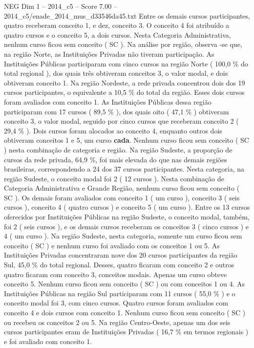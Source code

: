\begin{textsample}{NEG Dim 1 – 2014\_c5 – Score 7.00 – 2014\_c5/enade\_2014\_mus\_d33546da45.txt}
Entre os demais cursos participantes, quatro receberam conceito 1, e dez, conceito 3.
O conceito 4 foi atribuído a quatro cursos e o conceito 5, a dois cursos.
Nesta Categoria Administrativa, nenhum curso ficou sem conceito ( SC ).
Na análise por região, observa -se que, na região Norte, as Instituições Privadas não tiveram participação.
As Instituições Públicas participaram com cinco cursos na região Norte ( 100,0 \% do total regional ), dos quais três obtiveram conceitos 3, o valor modal, e dois obtiveram conceito 1.
Na região Nordeste, a rede privada concentrou dois dos 19 cursos participantes, o equivalente a 10,5 \% do total da região.
Esses dois cursos foram avaliados com conceito 1.
As Instituições Públicas dessa região participaram com 17 cursos ( 89,5 \% ), dos quais oito ( 47,1 \% ) obtiveram conceito 3, o valor modal, seguido por cinco cursos que receberam conceito 2 ( 29,4 \% ).
Dois cursos foram alocados ao conceito 4, enquanto outros dois obtiveram conceitos 1 e 5, um curso \textbf{cada}.
Nenhum curso ficou sem conceito ( SC ) nesta combinação de categoria e região.
Na região Sudeste, a proporção de cursos da rede privada, 64,9 \%, foi mais elevada do que nas demais regiões brasileiras, correspondendo a 24 dos 37 cursos participantes.
Nesta categoria, na região Sudeste, o conceito modal foi 2 ( 12 cursos ).
Nesta combinação de Categoria Administrativa e Grande Região, nenhum curso ficou sem conceito ( SC ).
Os demais foram avaliados com conceito 1 ( um curso ), conceito 3 ( seis cursos ), conceito 4 ( quatro cursos ) e conceito 5 ( um curso ).
Entre os 13 cursos oferecidos por Instituições Públicas na região Sudeste, o conceito modal, também, foi 2 ( seis cursos ), e os demais cursos receberam os conceitos 3 ( cinco cursos ) e 4 ( um curso ).
Na região Sudeste, nesta categoria, somente um curso ficou sem conceito ( SC ) e nenhum curso foi avaliado com os conceitos 1 ou 5.
As Instituições Privadas concentraram nove dos 20 cursos participantes da região Sul, 45,0 \% do total regional.
Desses, quatro ficaram com conceito 2 e outros quatro ficaram com conceito 3, conceitos modais.
Apenas um curso obteve conceito 5.
Nenhum curso ficou sem conceito ( SC ) ou com conceitos 1 ou 4.
As Instituições Públicas na região Sul participaram com 11 cursos ( 55,0 \% ) e o conceito modal foi 3, com cinco cursos.
Quatro cursos foram avaliados com conceito 4 e dois cursos com conceito 1.
Nenhum curso ficou sem conceito ( SC ) ou recebeu os conceitos 2 ou 5.
Na região Centro-Oeste, apenas um dos seis cursos participantes eram de Instituições Privadas ( 16,7 \% em termos regionais ) e foi avaliado com conceito 1.

\end{textsample}
